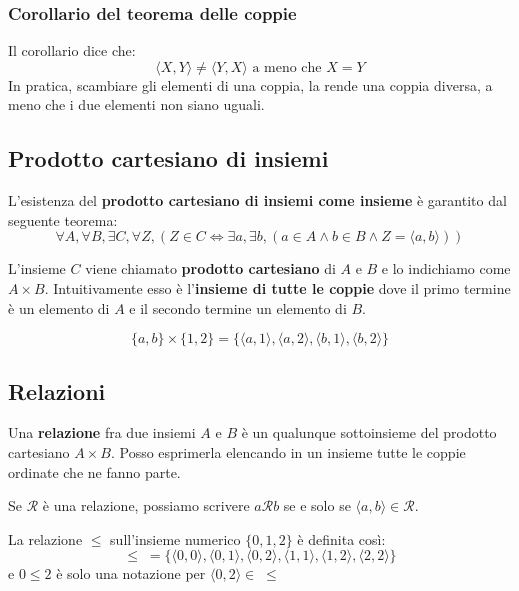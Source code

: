 \documentclass[
  a4paper,
]{article}
\begin{document}
\hypertarget{corollario-del-teorema-delle-coppie}{%
\subsubsection{Corollario del teorema delle
coppie}\label{corollario-del-teorema-delle-coppie}}

Il corollario dice che: \[
\langle X, Y \rangle \not = \langle Y, X \rangle \text{ a meno che } X = Y
\] In pratica, scambiare gli elementi di una coppia, la rende una coppia
diversa, a meno che i due elementi non siano uguali.

\hypertarget{prodotto-cartesiano-di-insiemi}{%
\subsection{Prodotto cartesiano di
insiemi}\label{prodotto-cartesiano-di-insiemi}}

L'esistenza del \textbf{prodotto cartesiano di insiemi come insieme} è
garantito dal seguente teorema: \[
\forall A, \forall B, \exists C, \forall Z, (Z \in C \iff \exists a, \exists b, (a \in A \land b \in B \land Z = \langle a, b \rangle ))
\]

L'insieme \(C\) viene chiamato \textbf{prodotto cartesiano} di \(A\) e
\(B\) e lo indichiamo come \(A \times B\). Intuitivamente esso è
l'\textbf{insieme di tutte le coppie} dove il primo termine è un
elemento di \(A\) e il secondo termine un elemento di \(B\).

\begin{examplebox}[Esempio]

\[
\{a, b\} \times \{1, 2\} = \{\langle a, 1 \rangle, \langle a, 2 \rangle , \langle b, 1 \rangle , \langle b, 2 \rangle\}
\]

\end{examplebox}

\hypertarget{relazioni}{%
\subsection{Relazioni}\label{relazioni}}

Una \textbf{relazione} fra due insiemi \(A\) e \(B\) è un qualunque
sottoinsieme del prodotto cartesiano \(A \times B\). Posso esprimerla
elencando in un insieme tutte le coppie ordinate che ne fanno parte.

Se \(\mathcal{R}\) è una relazione, possiamo scrivere
\(a \mathcal{R} b\) se e solo se
\(\langle a, b\rangle \in \mathcal{R}\).

\begin{examplebox}[Esempio]

La relazione \(\leq\) sull'insieme numerico \(\{0, 1, 2\}\) è definita
così: \[
\leq \; = \{\langle 0, 0 \rangle, \langle 0, 1 \rangle , \langle 0, 2 \rangle , \langle 1, 1 \rangle , \langle 1, 2 \rangle , \langle 2, 2 \rangle\}
\] e \(0 \leq 2\) è solo una notazione per
\(\langle 0, 2 \rangle \in \; \leq\)

\end{examplebox}
\end{document}
